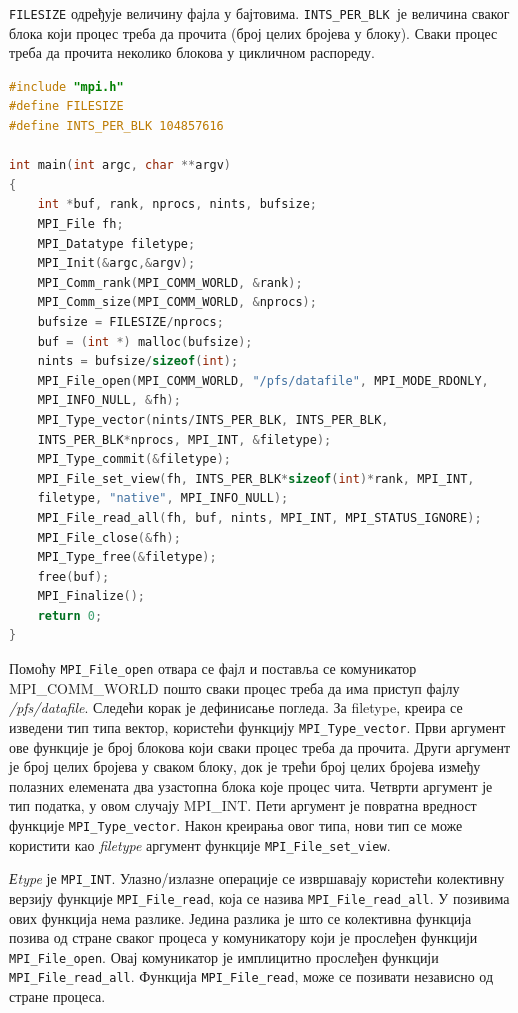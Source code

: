 \texttt{FILESIZE} одређује величину фајла у бајтовима. \texttt{INTS\_PER\_BLK }је величина сваког блока који процес треба да прочита (број целих бројева у блоку). Сваки процес треба да прочита неколико блокова у цикличном распореду.

\begin{lstlisting}[style=nonumbers,frame=single,language=C, caption=MPI програм са погледом фајла]
#include "mpi.h"
#define FILESIZE
#define INTS_PER_BLK 104857616

int main(int argc, char **argv)
{
	int *buf, rank, nprocs, nints, bufsize;
	MPI_File fh;
	MPI_Datatype filetype;
	MPI_Init(&argc,&argv);
	MPI_Comm_rank(MPI_COMM_WORLD, &rank);
	MPI_Comm_size(MPI_COMM_WORLD, &nprocs);
	bufsize = FILESIZE/nprocs;
	buf = (int *) malloc(bufsize);
	nints = bufsize/sizeof(int);
	MPI_File_open(MPI_COMM_WORLD, "/pfs/datafile", MPI_MODE_RDONLY,
	MPI_INFO_NULL, &fh);
	MPI_Type_vector(nints/INTS_PER_BLK, INTS_PER_BLK,
	INTS_PER_BLK*nprocs, MPI_INT, &filetype);
	MPI_Type_commit(&filetype);
	MPI_File_set_view(fh, INTS_PER_BLK*sizeof(int)*rank, MPI_INT,
	filetype, "native", MPI_INFO_NULL);
	MPI_File_read_all(fh, buf, nints, MPI_INT, MPI_STATUS_IGNORE);
	MPI_File_close(&fh);
	MPI_Type_free(&filetype);
	free(buf);
	MPI_Finalize();
	return 0;
}
\end{lstlisting}

Помоћу  \texttt{MPI\_File\_open} отвара се фајл и поставља се комуникатор MPI\_COMM\_WORLD пошто сваки процес треба да има приступ фајлу\textit{ /pfs/datafile}.
Следећи корак је дефинисање погледа. За filetype, креира се изведени тип типа вектор, користећи функцију \texttt{MPI\_Type\_vector}. Први аргумент ове функције је број блокова који сваки процес треба да прочита. Други аргумент је број целих бројева у сваком блоку, док је трећи број целих бројева између полазних елемената два узастопна блока које процес чита. Четврти аргумент је тип податка, у овом случају MPI\_INT. Пети аргумент је повратна вредност функције \texttt{MPI\_Type\_vector}. Након креирања овог типа, нови тип се може користити као \textit{filetype} аргумент функције \texttt{MPI\_File\_set\_view}. 

\textit{Еtype} је \texttt{MPI\_INT}. Улазно/излазне операције се извршавају користећи колективну верзију функције  \texttt{MPI\_File\_read}, која се назива \texttt{MPI\_File\_read\_all}. У позивима ових функција нема разлике. Једина разлика је што се колективна функција позива од стране сваког процеса у комуникатору који је прослеђен функцији \texttt{MPI\_File\_open}. Овај комуникатор је имплицитно прослеђен функцији \texttt{MPI\_File\_read\_all}. Функција \texttt{MPI\_File\_read}, може се позивати независно од стране процеса.


